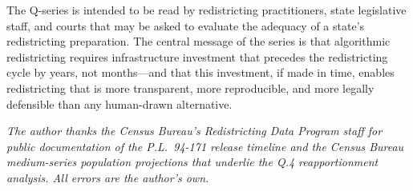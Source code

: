 The Q-series is intended to be read by redistricting practitioners, state legislative
staff, and courts that may be asked to evaluate the adequacy of a state's redistricting
preparation. The central message of the series is that algorithmic redistricting
requires infrastructure investment that precedes the redistricting cycle by years,
not months---and that this investment, if made in time, enables redistricting that
is more transparent, more reproducible, and more legally defensible than any
human-drawn alternative.

\bigskip
\noindent\textit{The author thanks the Census Bureau's Redistricting Data Program staff
for public documentation of the P.L.\ 94-171 release timeline and the Census Bureau
medium-series population projections that underlie the Q.4 reapportionment analysis.
All errors are the author's own.}
